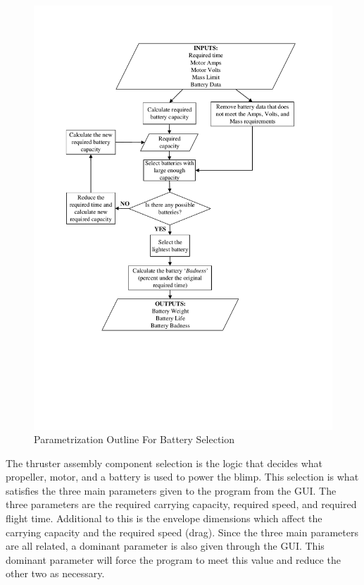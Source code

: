 \documentclass[../main.tex]{subfiles}
\begin{document}
\begin{figure}[H]
	\centering
	\includegraphics[width=0.95\linewidth]{img/paramaterization/batteryChoice.pdf}
	\caption{Parametrization Outline For Battery Selection}
	\label{fig:batteryOutline}
\end{figure}


The thruster assembly component selection is the logic that decides what propeller, motor, and a battery is used to power the blimp. This selection is what satisfies the three main parameters given to the program from the GUI. The three parameters are the required carrying capacity, required speed, and required flight time. Additional to this is the envelope dimensions which affect the carrying capacity and the required speed (drag). Since the three main parameters are all related, a dominant parameter is also given through the GUI. This dominant parameter will force the program to meet this value and reduce the other two as necessary.
\end{document}

